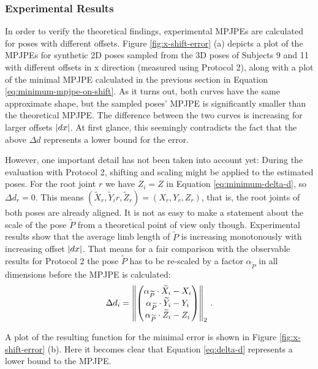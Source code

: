 \subsubsection{Experimental Results}

In order to verify the theoretical findings, experimental MPJPEs are calculated for poses with different offsets.
Figure \ref{fig:x-shift-error} (a) depicts a plot of the MPJPEs for synthetic 2D poses sampled from the 3D poses of Subjects 9 and 11 with different offsets in x direction (measured using Protocol 2), along with a plot of the minimal MPJPE calculated in the previous section in Equation \eqref{eq:minimum-mpjpe-on-shift}.
As it turns out, both curves have the same approximate shape, but the sampled poses' MPJPE is significantly smaller than the theoretical MPJPE.
The difference between the two curves is increasing for larger offsets $\abs{dx}$.
At first glance, this seemingly contradicts the fact that the above $\Delta d$ represents a lower bound for the error.

However, one important detail has not been taken into account yet:
During the evaluation with Protocol 2, shifting and scaling might be applied to the estimated poses. 
For the root joint $r$ we have $Z_i = Z$ in Equation \eqref{eq:minimum-delta-d}, so $\Delta d_r = 0$. 
This means $(\widetilde{X}_r, \widetilde{Y}_ir, \widetilde{Z}_r) = (X_r, Y_r, Z_r)$, that is, the root joints of both poses are already aligned.
It is not as easy to make a statement about the scale of the pose $\widetilde{P}$ from a theoretical point of view only though.
Experimental results show that the average limb length of $\widetilde{P}$ is increasing monotonously with increasing offset $\abs{dx}$.
That means for a fair comparison with the observable results for Protocol 2 the pose $\widetilde{P}$ has to be re-scaled by a factor $\alpha_{\widetilde{P}}$ in all dimensions before the MPJPE is calculated:
\begin{equation}
	\Delta d_i = \norm{ 
	\begin{pmatrix}
		\alpha_{\widetilde{P}} \cdot \widetilde{X}_i - X_i \\
		\alpha_{\widetilde{P}} \cdot \widetilde{Y}_i - Y_i \\
		\alpha_{\widetilde{P}} \cdot \widetilde{Z}_i - Z_i
	\end{pmatrix}
	}_2 \ .
\end{equation}


 
A plot of the resulting function for the minimal error is shown in Figure \ref{fig:x-shift-error} (b).
Here it becomes clear that Equation \eqref{eq:delta-d} represents a lower bound to the MPJPE.


